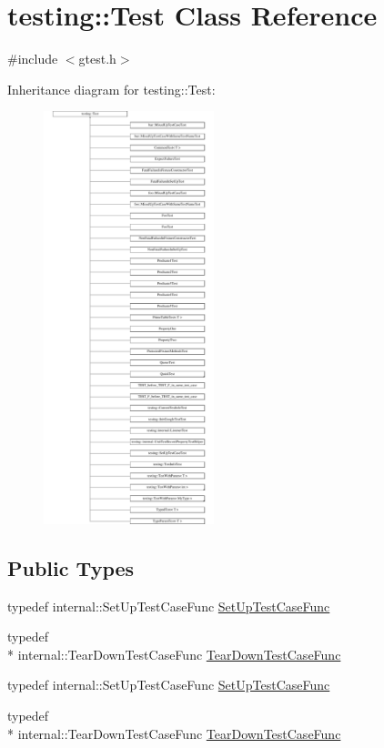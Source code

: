 \hypertarget{classtesting_1_1_test}{\section{testing\-:\-:Test Class Reference}
\label{classtesting_1_1_test}
}


{\ttfamily \#include $<$gtest.\-h$>$}

Inheritance diagram for testing\-:\-:Test\-:\begin{figure}[H]
\begin{center}
\leavevmode
\includegraphics[height=12.000000cm]{classtesting_1_1_test}
\end{center}
\end{figure}
\subsection*{Public Types}
\begin{DoxyCompactItemize}
\item 
typedef internal\-::\-Set\-Up\-Test\-Case\-Func \hyperlink{classtesting_1_1_test_a5f2a051d1d99c9b784c666c586186cf9}{Set\-Up\-Test\-Case\-Func}
\item 
typedef \\*
internal\-::\-Tear\-Down\-Test\-Case\-Func \hyperlink{classtesting_1_1_test_aa0f532e93b9f3500144c53f31466976c}{Tear\-Down\-Test\-Case\-Func}
\item 
typedef internal\-::\-Set\-Up\-Test\-Case\-Func \hyperlink{classtesting_1_1_test_a5f2a051d1d99c9b784c666c586186cf9}{Set\-Up\-Test\-Case\-Func}
\item 
typedef \\*
internal\-::\-Tear\-Down\-Test\-Case\-Func \hyperlink{classtesting_1_1_test_aa0f532e93b9f3500144c53f31466976c}{Tear\-Down\-Test\-Case\-Func}
\end{DoxyCompactItemize}
